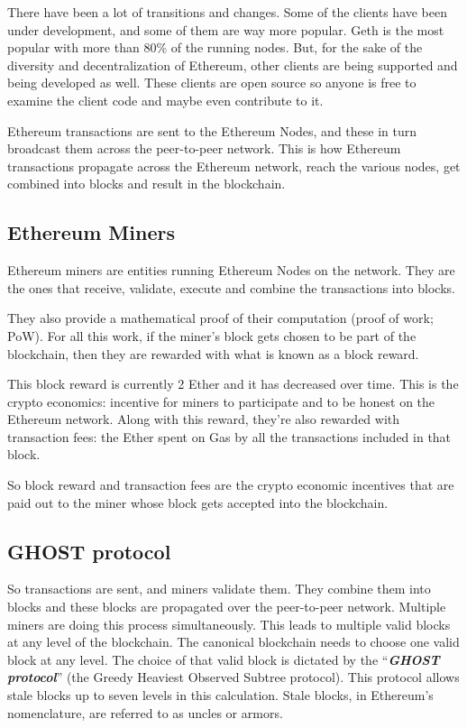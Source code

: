 There have been a lot of transitions and changes. Some of the clients
have been under development, and some of them are way more popular. Geth
is the most popular with more than 80\% of the running nodes. But, for
the sake of the diversity and decentralization of Ethereum, other
clients are being supported and being developed as well. These clients
are open source so anyone is free to examine the client code and maybe
even contribute to it.

Ethereum transactions are sent to the Ethereum Nodes, and these in turn
broadcast them across the peer-to-peer network. This is how Ethereum
transactions propagate across the Ethereum network, reach the various
nodes, get combined into blocks and result in the blockchain.

\subsection{Ethereum Miners}\label{ethereum-miners}

Ethereum miners are entities running Ethereum Nodes on the network. They
are the ones that receive, validate, execute and combine the
transactions into blocks.

They also provide a mathematical proof of their computation (proof of
work; PoW). For all this work, if the miner's block gets chosen to be
part of the blockchain, then they are rewarded with what is known as a
block reward.

This block reward is currently 2 Ether and it has decreased over time.
This is the crypto economics: incentive for miners to participate and to
be honest on the Ethereum network. Along with this reward, they're also
rewarded with transaction fees: the Ether spent on Gas by all the
transactions included in that block.

So block reward and transaction fees are the crypto economic incentives
that are paid out to the miner whose block gets accepted into the
blockchain.

\subsection{GHOST protocol}\label{ghost-protocol}

So transactions are sent, and miners validate them. They combine them
into blocks and these blocks are propagated over the peer-to-peer
network. Multiple miners are doing this process simultaneously. This
leads to multiple valid blocks at any level of the blockchain. The
canonical blockchain needs to choose one valid block at any level. The
choice of that valid block is dictated by the ``\emph{\textbf{GHOST
protocol}}'' (the Greedy Heaviest Observed Subtree protocol). This
protocol allows stale blocks up to seven levels in this calculation.
Stale blocks, in Ethereum's nomenclature, are referred to as uncles or
armors.
